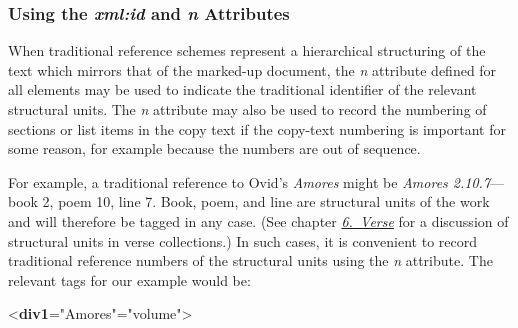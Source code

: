 \subsubsection[{Using the xml:id and n Attributes}]{Using the {\itshape xml:id} and {\itshape n} Attributes}\label{CORS1}\par
When traditional reference schemes represent a hierarchical structuring of the text which mirrors that of the marked-up document, the {\itshape n} attribute defined for all elements may be used to indicate the traditional identifier of the relevant structural units. The {\itshape n} attribute may also be used to record the numbering of sections or list items in the copy text if the copy-text numbering is important for some reason, for example because the numbers are out of sequence.\par
For example, a traditional reference to Ovid's \textit{Amores} might be \textit{Amores 2.10.7}—book 2, poem 10, line 7. Book, poem, and line are structural units of the work and will therefore be tagged in any case. (See chapter \textit{\hyperref[VE]{6.\ Verse}} for a discussion of structural units in verse collections.) In such cases, it is convenient to record traditional reference numbers of the structural units using the {\itshape n} attribute. The relevant tags for our example would be: \par\bgroup{}\exampleFont \begin{shaded}\noindent\mbox{}{<\textbf{div1}\hspace*{1em}{n}="{Amores}"\hspace*{1em}{type}="{volume}">}\mbox{}\newline 
{}\mbox{}\newline 

\end{shaded}
